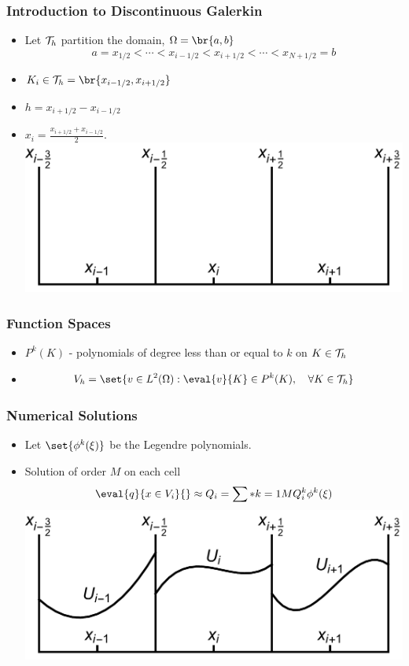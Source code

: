 \documentclass[10pt]{beamer}
\begin{document}
    \begin{frame}
      \frametitle{Introduction to Discontinuous Galerkin}
      \begin{itemize}
        \item Let $\mathcal{T}_h$ partition the domain, $\Omega = \br{a, b}$
          \[
            a = x_{1/2} < \cdots < x_{i-1/2} < x_{i+1/2} < \cdots < x_{N + 1/2} = b
          \]

        \item $K_i \in \mcT_h = \br{x_{i-1/2}, x_{i+1/2}}$
        \item $h = x_{i + 1/2} - x_{i - 1/2}$
        \item $x_i = \frac{x_{i+1/2} + x_{i-1/2}}{2}$.
          \includegraphics[scale=0.35]{Figures/Cells.pdf}
      \end{itemize}
    \end{frame}

    \begin{frame}
      \frametitle{Function Spaces}
      \begin{itemize}
        \item $P^k(K)$ - polynomials of degree less than or equal to $k$ on $K \in \mathcal{T}_h$
        \item 
          \[
            V_h = \set{v \in L^2(\Omega): \eval{v}{K} \in P^k(K), \quad \forall K \in \mcT_h}
          \]
      \end{itemize}
    \end{frame}

    \begin{frame}
      \frametitle{Numerical Solutions}
      \begin{itemize}
        \item Let $\set{\phi^k(\xi)}$ be the Legendre polynomials.

        \item Solution of order $M$ on each cell
          \[
            \eval{q}{x \in V_i}{} \approx Q_i = \sum*{k = 1}{M}{Q_i^k \phi^k(\xi)}
          \]
          \includegraphics[scale=0.35]{Figures/DG.pdf}
      \end{itemize}
    \end{frame}
\end{document}
